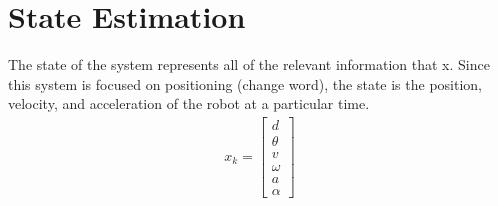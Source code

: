 \documentclass[a4paper,10pt]{report}
\begin{document}
\section{State Estimation}
The state of the system represents all of the relevant information that x.  Since this system is focused on positioning (change word), the state is the position, velocity, and acceleration of the robot at a particular time.
\begin{gather*}
x_{k} = \begin{bmatrix} d \\ \theta \\ v \\ \omega \\ a \\ \alpha \end{bmatrix}
\end{gather*}
\end{document}
